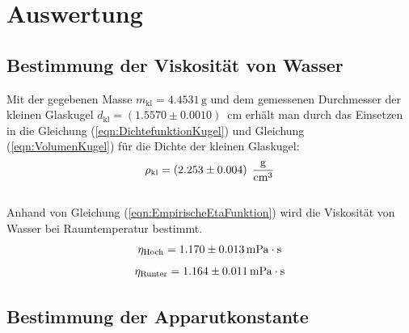 

\section{Auswertung}
\label{sec:Auswertung}

\subsection{Bestimmung der Viskosität von Wasser}
\label{sec:}
Mit der gegebenen Masse $m_{\text{kl}} = 4.4531\,\unit{\gram}$  und dem gemessenen Durchmesser 
der kleinen Glaskugel $d_{\text{kl}}= \left(1.5570 \pm 0.0010\right)\,$ \unit{\centi \meter} erhält man durch
das Einsetzen in die Gleichung (\ref{eqn:DichtefunktionKugel}) und Gleichung (\ref{eqn:VolumenKugel}) für 
die Dichte der kleinen Glaskugel:
$$\rho_{\text{kl}} = \left(2.253 \pm 0.004\right)\;\unit[per-mode=fraction]{\gram\per\cubic\centi\meter}$$\\
Anhand von Gleichung (\ref{eqn:EmpirischeEtaFunktion}) wird die Viskosität von Wasser bei Raumtemperatur bestimmt. 
$$\eta_{\text{Hoch}} = 1.170\pm0.013 \, \unit[inter-unit-product=\cdot]{\milli\pascal\second}$$
$$\eta_{\text{Runter}} = 1.164\pm0.011  \, \unit[inter-unit-product=\cdot]{\milli\pascal\second}$$
\subsection{Bestimmung der Apparutkonstante}
\label{sec:}

